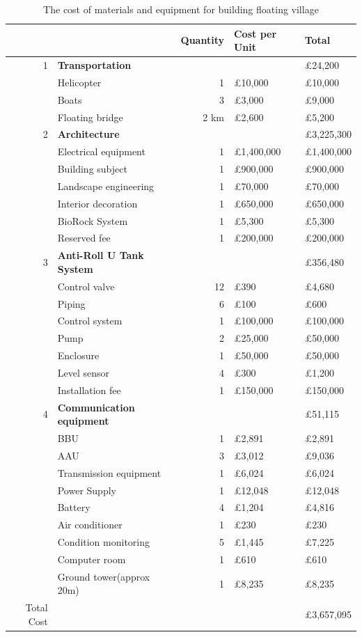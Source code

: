 \documentclass[11pt]{article}
\numberwithin{equation}{section}
\begin{document}
\begin{table}[H]
\caption{\label{TotalCost}The cost of materials and equipment for building floating village}
\centering
\begin{tabular}{rlrll}
\toprule
 &  & \textbf{Quantity} & \textbf{Cost per Unit} & \textbf{Total}\\
\midrule
1 & \textbf{Transportation} &  &  & £24,200\\
\midrule
 & Helicopter & 1 & £10,000 & £10,000\\
 & Boats & 3 & £3,000 & £9,000\\
 & Floating bridge & 2 km & £2,600 & £5,200\\
\midrule
2 & \textbf{Architecture} &  &  & £3,225,300\\
\midrule
 & Electrical equipment & 1 & £1,400,000 & £1,400,000\\
 & Building subject & 1 & £900,000 & £900,000\\
 & Landscape engineering & 1 & £70,000 & £70,000\\
 & Interior decoration & 1 & £650,000 & £650,000\\
 & BioRock System & 1 & £5,300 & £5,300\\
 & Reserved fee & 1 & £200,000 & £200,000\\
\midrule
3 & \textbf{Anti-Roll U Tank System} &  &  & £356,480\\
\midrule
 & Control valve & 12 & £390 & £4,680\\
 & Piping & 6 & £100 & £600\\
 & Control system & 1 & £100,000 & £100,000\\
 & Pump & 2 & £25,000 & £50,000\\
 & Enclosure & 1 & £50,000 & £50,000\\
 & Level sensor & 4 & £300 & £1,200\\
 & Installation fee & 1 & £150,000 & £150,000\\
\midrule
4 & \textbf{Communication equipment} &  &  & £51,115\\
\midrule
 & BBU & 1 & £2,891 & £2,891\\
 & AAU & 3 & £3,012 & £9,036\\
 & Transmission equipment & 1 & £6,024 & £6,024\\
 & Power Supply & 1 & £12,048 & £12,048\\
 & Battery & 4 & £1,204 & £4,816\\
 & Air conditioner & 1 & £230 & £230\\
 & Condition monitoring & 5 & £1,445 & £7,225\\
 & Computer room & 1 & £610 & £610\\
 & Ground tower(approx 20m) & 1 & £8,235 & £8,235\\
\midrule
Total Cost &  &  &  & £3,657,095\\
\bottomrule
\end{tabular}
\end{table}
\end{document}
